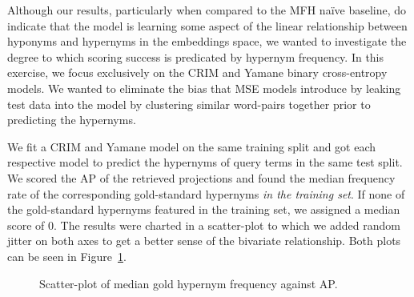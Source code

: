 Although our results, particularly when compared to the \ac{MFH} na\"ive baseline, do indicate that the model is learning some aspect of the linear relationship between hyponyms and hypernyms in the embeddings space, we wanted to investigate the degree to which scoring success is predicated by hypernym frequency.  In this exercise, we focus exclusively on the CRIM and Yamane binary cross-entropy models.  We wanted to eliminate the bias that \ac{MSE} models introduce by leaking test data into the model by clustering similar word-pairs together prior to predicting the hypernyms.

We fit a CRIM and Yamane model on the same training split and got each respective model to predict the hypernyms of query terms in the same test split.  We scored the \ac{AP} of the retrieved projections and found the median frequency rate of the corresponding gold-standard hypernyms \textit{in the training set}.  If none of the gold-standard hypernyms featured in the training set, we assigned a median score of 0. The results were charted in a scatter-plot to which we added random jitter on both axes to get a better sense of the bivariate relationship.  %
Both plots can be seen in Figure~\ref{fig:scatter_crim_yamane}.
\begin{figure}[!ht]
    \centering
    \qquad
    \caption{Scatter-plot of median gold hypernym frequency against AP.}        
    \label{fig:scatter_crim_yamane}
\end{figure}

